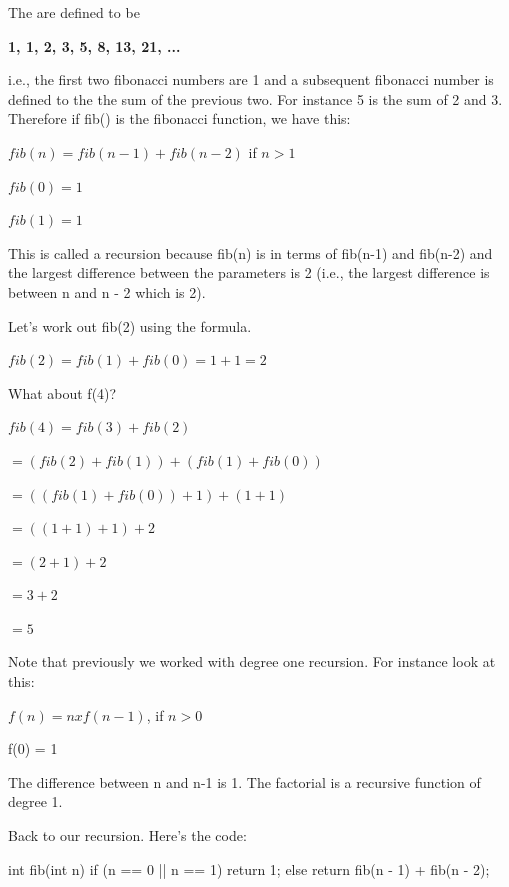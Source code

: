 



\newpage{}

The  are defined to be

\textbf{1, 1, 2, 3, 5, 8, 13, 21, ...}

i.e., the first two fibonacci numbers are 1 and a subsequent fibonacci
number is defined to the the sum of the previous two. For instance 5 is
the sum of 2 and 3. Therefore if fib() is the fibonacci function, we
have this:

$fib(n) = fib(n-1) + fib(n-2)$ if $n > 1$

$fib(0) = 1$

$fib(1) = 1$

This is called a  recursion because fib(n) is in
terms of fib(n-1) and fib(n-2) and the largest difference between the
parameters is 2 (i.e., the largest difference is between n and n - 2 which is 2).



Let's work out fib(2) using the formula.

$fib(2) = fib(1) + fib(0) = 1 + 1 = 2$

What about f(4)?

$fib(4) = fib(3) + fib(2)$

$= (fib(2) + fib(1)) + (fib(1) + fib(0))$

$= ((fib(1) + fib(0)) + 1) + (1 + 1)$

$= ((1 + 1) + 1) + 2$

$= (2 + 1) + 2$

$= 3 + 2$

$= 5$

Note that previously we worked with degree one recursion. For instance
look at this:

$f(n) = n x f(n-1)$, if $n > 0$

f(0) = 1

The difference between n and n-1 is 1. The factorial is a recursive
function of degree 1.

Back to our recursion. Here's the code:

\begin{consolethree}[escapeinside=||]
int fib(int n)
{
    if (n == 0 || n == 1)
        return 1;
    else
        return fib(n - 1) + fib(n - 2);
}
\end{consolethree}

